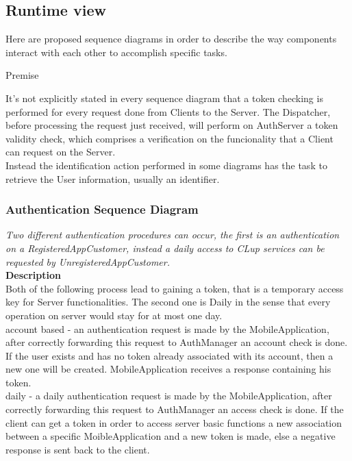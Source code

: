\subsection{Runtime view}
Here are proposed sequence diagrams in order to describe the way components interact with each other to accomplish specific tasks.\\

\begin{center} 
Premise\\
\end{center}
It’s not explicitly stated in every sequence diagram that a token checking is performed for every request done from Clients to the Server. The Dispatcher, before processing the request just received, will perform on AuthServer a token validity check, which comprises a verification on the funcionality that a Client can request on the Server. \\ 
Instead the identification action performed in some diagrams has the task to retrieve the User information, usually an identifier.\\

\newpage
\subsubsection{Authentication Sequence Diagram}
\textit{Two different authentication procedures can occur, the first is an authentication on a RegisteredAppCustomer, instead a daily access to CLup services can be requested by UnregisteredAppCustomer.\\}
\textbf{Description\\}
Both of the following process lead to gaining a token, that is a temporary access key for Server functionalities. The second one is Daily in the sense that every operation on server would stay for at most one day.\\
account based - an authentication request is made by the MobileApplication, after correctly forwarding this request to AuthManager an account check is done. If the user exists and has no token already associated with its account, then a new one will be created. MobileApplication receives a response containing his token. \\
daily - a daily authentication request is made by the MobileApplication, after correctly forwarding this request to AuthManager an access check is done. If the client can get a token in order to access server basic functions a new association between a specific MoibleApplication and a new token is made, else a negative response is sent back to the client. \\

